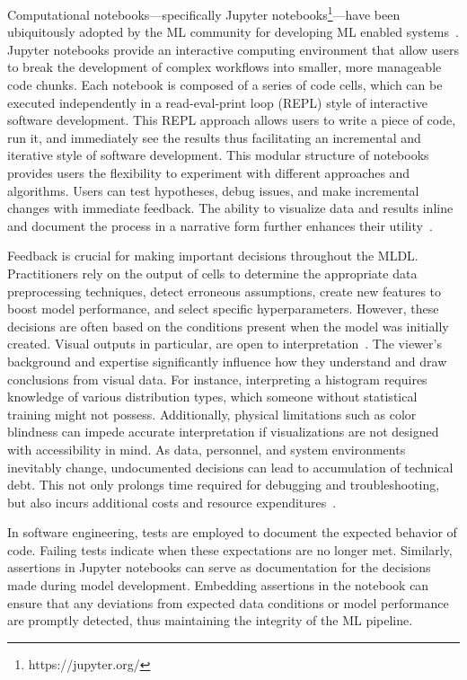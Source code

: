 Computational notebooks---specifically Jupyter notebooks\footnote{https://jupyter.org/}---have been ubiquitously adopted by the ML community for developing ML enabled systems~\cite{pimentel2019large-scale,quaranta2021kgtorrent,psallidas2019data,perkel2018why}. Jupyter notebooks provide an interactive computing environment that allow users to break the development of complex workflows into smaller, more manageable code chunks. Each notebook is composed of a series of code cells, which can be executed independently in a read-eval-print loop (REPL) style of interactive software development. This REPL approach allows users to write a piece of code, run it, and immediately see the results thus facilitating an incremental and iterative style of software development. This modular structure of notebooks provides users the flexibility to experiment with different approaches and algorithms. Users can test hypotheses, debug issues, and make incremental changes with immediate feedback. The ability to visualize data and results inline and document the process in a narrative form further enhances their utility~\cite{kery2018story,head2019managing,rule2018exploration,chattopadhyay2020whats}.

Feedback is crucial for making important decisions throughout the MLDL. Practitioners rely on the output of cells to determine the appropriate data preprocessing techniques, detect erroneous assumptions, create new features to boost model performance, and select specific hyperparameters. However, these decisions are often based on the conditions present when the model was initially created. Visual outputs in particular, are open to interpretation~\cite{heer2010tour}. The viewer's background and expertise significantly influence how they understand and draw conclusions from visual data. 
For instance, interpreting a histogram requires knowledge of various distribution types, which someone without statistical training might not possess. Additionally, physical limitations such as color blindness can impede accurate interpretation if visualizations are not designed with accessibility in mind. As data, personnel, and system environments inevitably change, undocumented decisions can lead to accumulation of technical debt. This not only prolongs time required for debugging and troubleshooting, but also incurs additional costs and resource expenditures~\cite{sculley2015hidden,amershi2019software,sambasivan2021everyone}.

In software engineering, tests are employed to document the expected behavior of code. Failing tests indicate when these expectations are no longer met. Similarly, assertions in Jupyter notebooks can serve as documentation for the decisions made during model development. Embedding assertions in the notebook can ensure that any deviations from expected data conditions or model performance are promptly detected, thus maintaining the integrity of the ML pipeline.

